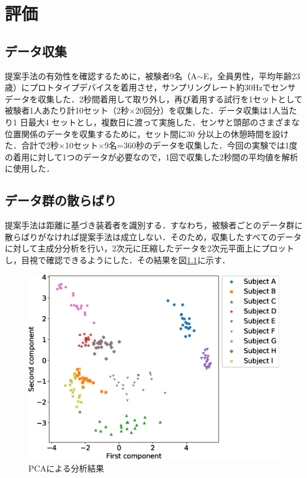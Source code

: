 \chapter{評価}
\label{evaluation}
\section{データ収集}
提案手法の有効性を確認するために，被験者9名（A$\sim$E，全員男性，平均年齢23歳）にプロトタイプデバイスを着用させ，サンプリングレート約30Hzでセンサデータを収集した．2秒間着用して取り外し，再び着用する試行を1セットとして被験者1人あたり計10セット（2秒$\times$20回分）を収集した．データ収集は1人当たり1 日最大4 セットとし，複数日に渡って実施した．センサと頭部のさまざまな位置関係のデータを収集するために，セット間に30 分以上の休憩時間を設けた．合計で2秒×10セット×9名=360秒のデータを収集した．今回の実験では1度の着用に対して1つのデータが必要なので，1回で収集した2秒間の平均値を解析に使用した．

\section{データ群の散らばり}
提案手法は距離に基づき装着者を識別する．すなわち，被験者ごとのデータ群に散らばりがなければ提案手法は成立しない．そのため，収集したすべてのデータに対して主成分分析を行い，2次元に圧縮したデータを2次元平面上にプロットし，目視で確認できるようにした．その結果を図\ref{PCA}に示す．\par

\begin{figure}[!t]
  \begin{center}
    \includegraphics[width=1\linewidth]{figure/PCA.eps}
  \end{center}
  \caption{PCAによる分析結果}
  \label{PCA}
\end{figure}

